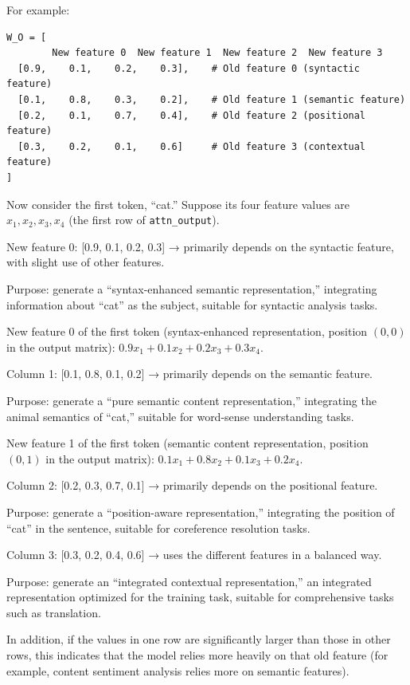 For example:

\begin{verbatim}
W_O = [
        New feature 0  New feature 1  New feature 2  New feature 3
  [0.9,    0.1,    0.2,    0.3],    # Old feature 0 (syntactic feature)
  [0.1,    0.8,    0.3,    0.2],    # Old feature 1 (semantic feature)
  [0.2,    0.1,    0.7,    0.4],    # Old feature 2 (positional feature)
  [0.3,    0.2,    0.1,    0.6]     # Old feature 3 (contextual feature)
]
\end{verbatim}

Now consider the first token, ``cat.'' Suppose its four feature values are \(x_1,x_2,x_3,x_4\) (the first row of \texttt{attn\_output}).

New feature 0: {[}0.9, 0.1, 0.2, 0.3{]} → primarily depends on the syntactic feature, with slight use of other features.

Purpose: generate a ``syntax-enhanced semantic representation,'' integrating information about ``cat'' as the subject, suitable for syntactic analysis tasks.

New feature 0 of the first token (syntax-enhanced representation, position \((0,0)\) in the output matrix): \(0.9x_1+0.1x_2+0.2x_3+0.3x_4\).

Column 1: {[}0.1, 0.8, 0.1, 0.2{]} → primarily depends on the semantic feature.

Purpose: generate a ``pure semantic content representation,'' integrating the animal semantics of ``cat,'' suitable for word-sense understanding tasks.

New feature 1 of the first token (semantic content representation, position \((0,1)\) in the output matrix): \(0.1x_1+0.8x_2+0.1x_3+0.2x_4\).

Column 2: {[}0.2, 0.3, 0.7, 0.1{]} → primarily depends on the positional feature.

Purpose: generate a ``position-aware representation,'' integrating the position of ``cat'' in the sentence, suitable for coreference resolution tasks.

Column 3: {[}0.3, 0.2, 0.4, 0.6{]} → uses the different features in a balanced way.

Purpose: generate an ``integrated contextual representation,'' an integrated representation optimized for the training task, suitable for comprehensive tasks such as translation.

In addition, if the values in one row are significantly larger than those in other rows, this indicates that the model relies more heavily on that old feature (for example, content sentiment analysis relies more on semantic features).

